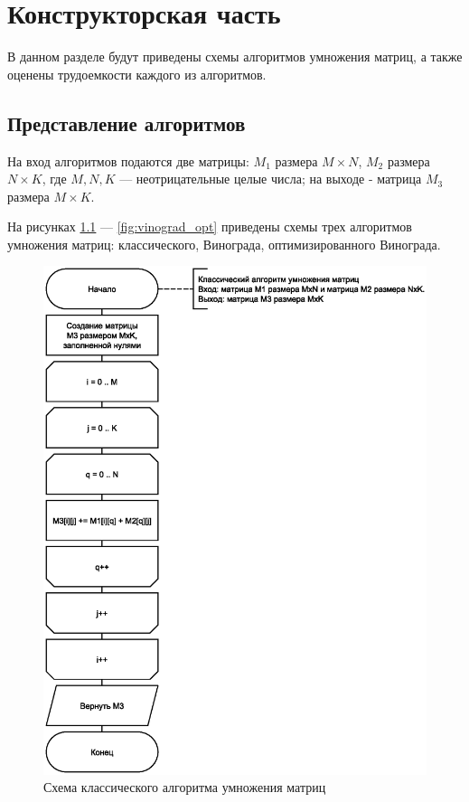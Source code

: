 \chapter{Конструкторская часть}
В данном разделе будут приведены схемы алгоритмов умножения матриц, а также оценены трудоемкости каждого из алгоритмов.

\section{Представление алгоритмов}

На вход алгоритмов подаются две матрицы: $M_{1}$ размера $M \times N$, $M_{2}$ размера $N \times K$, где $M, N, K$ --- неотрицательные целые числа; на выходе - матрица $M_{3}$ размера $M \times K$.

На рисунках \ref{fig:classic} --- \ref{fig:vinograd_opt} приведены схемы трех алгоритмов умножения матриц: классического, Винограда, оптимизированного Винограда.

\clearpage

\begin{figure}[h]
	\centering
	\includegraphics[scale=0.8]{img/classic.eps}
	\caption{Схема классического алгоритма умножения матриц}
	\label{fig:classic}
\end{figure}

